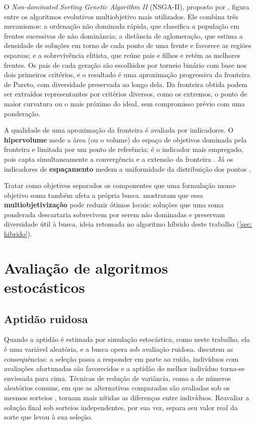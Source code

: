 O \textit{Non-dominated Sorting Genetic Algorithm II} (NSGA-II), proposto por , figura entre os algoritmos evolutivos multiobjetivo mais utilizados. Ele combina três mecanismos: a ordenação não dominada rápida, que classifica a população em frentes sucessivas de não dominância; a distância de aglomeração, que estima a densidade de soluções em torno de cada ponto de uma frente e favorece as regiões esparsas; e a sobrevivência elitista, que reúne pais e filhos e retém as melhores frentes. Os pais de cada geração são escolhidos por torneio binário com base nos dois primeiros critérios, e o resultado é uma aproximação progressiva da fronteira de Pareto, com diversidade preservada ao longo dela. Da fronteira obtida podem ser extraídos representantes por critérios diversos, como os extremos, o ponto de maior curvatura ou o mais próximo do ideal, sem compromisso prévio com uma ponderação.

A qualidade de uma aproximação da fronteira é avaliada por indicadores. O \textbf{hipervolume} mede a área (ou o volume) do espaço de objetivos dominada pela fronteira e limitada por um ponto de referência; é o indicador mais empregado, pois capta simultaneamente a convergência e a extensão da fronteira \cite{zitzler1999multiobjective}. Já os indicadores de \textbf{espaçamento} medem a uniformidade da distribuição dos pontos \cite{schott1995fault}.

Tratar como objetivos separados os componentes que uma formulação mono-objetivo soma também afeta a própria busca.  mostraram que essa \textbf{multiobjetivização} pode reduzir ótimos locais: soluções que uma soma ponderada descartaria sobrevivem por serem não dominadas e preservam diversidade útil à busca, ideia retomada no algoritmo híbrido deste trabalho (\autoref{sec: hibrido}).

\section{Avaliação de algoritmos estocásticos}
\label{sec: avaliacao_estocasticos}

\subsection{Aptidão ruidosa}

Quando a aptidão é estimada por simulação estocástica, como neste trabalho, ela é uma variável aleatória, e a busca opera sob avaliação ruidosa.  discutem as consequências: a seleção passa a responder em parte ao ruído, indivíduos com avaliações afortunadas são favorecidos e a aptidão do melhor indivíduo torna-se enviesada para cima. Técnicas de redução de variância, como a de números aleatórios comuns, em que as alternativas comparadas são avaliadas sob os mesmos sorteios \cite{law2015simulation}, tornam mais nítidas as diferenças entre indivíduos. Reavaliar a solução final sob sorteios independentes, por sua vez, separa seu valor real da sorte que levou à sua seleção.

